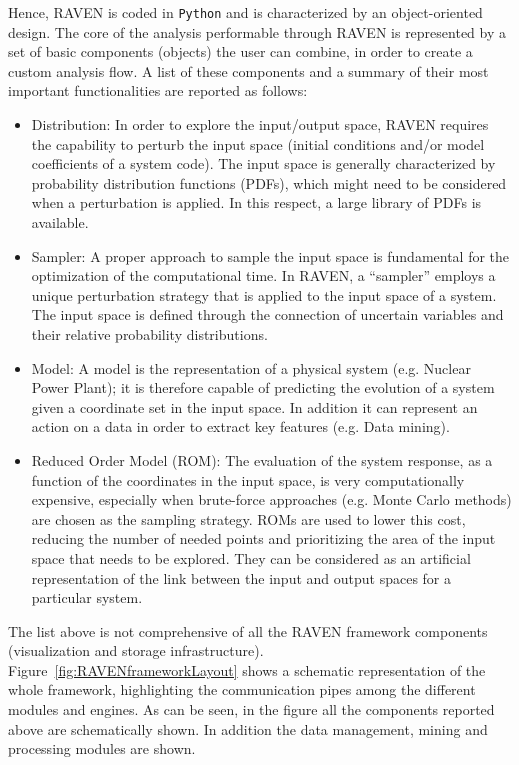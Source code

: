 Hence, RAVEN is coded in \texttt{Python} and is characterized by an object-oriented design. The core of the analysis performable through RAVEN is represented by a set of basic components (objects) the user can combine, in order to create a custom analysis flow. A list of these components and a summary of their most important functionalities are reported as follows:
\begin{itemize}
\item	Distribution: In order to explore the input/output space, RAVEN requires the capability to perturb the input space (initial conditions and/or model coefficients of a system code). The input space is generally characterized by probability distribution functions (PDFs), which might need to be considered when a perturbation is applied. In this respect, a large library of PDFs is available.
\item Sampler: A proper approach to sample the input space is fundamental for the optimization of the computational time. In RAVEN, a ``sampler'' employs a unique perturbation strategy that is applied to the input space of a system. The input space is defined through the connection of uncertain variables and their relative probability distributions. 
\item Model: A model is the representation of a physical system (e.g. Nuclear Power Plant); it is therefore capable of predicting the evolution of a system given a coordinate set in the input space. In addition it can represent an
action on a data in order to extract key features (e.g. Data mining).
\item Reduced Order Model (ROM): The evaluation of the system response, as a function of the coordinates in the input space, is very computationally expensive, especially when brute-force approaches (e.g. Monte Carlo methods) are chosen as the sampling strategy. ROMs are used to lower this cost, reducing the number of needed points and prioritizing the area of the input space that needs to be explored. They can be considered as an artificial representation of the link between the input and output spaces for a particular system. 
\end{itemize}
The list above is not comprehensive of all the RAVEN framework components (visualization and storage infrastructure).
\\ Figure~\ref{fig:RAVENframeworkLayout} shows a schematic representation of the whole framework, highlighting the communication pipes among the different modules and engines. As can be seen, in the figure all the components reported above are schematically shown. In addition the data management, mining and processing modules are shown.

